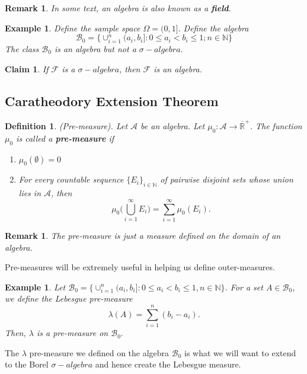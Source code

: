 \documentclass[twoside]{article}
\newtheorem{claim}[theorem]{Claim}
\newtheorem{definition}[theorem]{Definition}
\newtheorem{remark}[theorem]{Remark}
\newtheorem{example}[theorem]{Example}
\newcommand{\algebra}{\mathcal{A}}
\newcommand{\sigmalgebra}{\mathcal{F}}
\newcommand{\borelsigmaalgebra}{\mathcal{B}}
\newcommand{\sa}{\sigma-algebra}
\newcommand{\positiveextendedreal}{\overline{\mathbb{R}}^+}
\begin{document}
\begin{remark}In some text, an algebra is also known as a \textbf{field}.
\end{remark}

\begin{example} Define the sample space $\Omega = (0,1].$ Define the algebra 
$$
\borelsigmaalgebra_0 = \{\cup_{i=1}^{n}(a_i,b_i]: 0 \leq a_i < b_i \leq 1; n \in \mathbb{N}\}
$$
The class $\borelsigmaalgebra_0$ is an algebra but not a $\sa.$
\end{example}



\begin{claim}If $\sigmalgebra$ is a $\sa$, then $\sigmalgebra$ is an algebra.
\end{claim}


\subsection{Caratheodory Extension Theorem}
\begin{definition}(Pre-measure). Let $\algebra$ be an algebra. Let $\mu_0: \algebra \rightarrow \positiveextendedreal$. The function $\mu_0$ is called a \textbf{pre-measure} if 
\begin{enumerate}
\item $\mu_0(\emptyset) = 0$
\item For every countable sequence $\{E_i\}_{i \in \mathbb{N}}$ of pairwise disjoint sets whose union lies in $\algebra$, then 
$$
\mu_0\bigg(\bigcup_{i=1}^{\infty}E_i \bigg) = \sum_{i=1}^{\infty}\mu_0(E_i).
$$
\end{enumerate}
\end{definition}

\begin{remark}The pre-measure is just a measure defined on the domain of an algebra.
\end{remark}

Pre-measures will be extremely useful in helping us define outer-measures.


\begin{example}Let $\borelsigmaalgebra_0 = \{\cup_{i=1}^{n} (a_i, b_i]: 0 \leq a_i < b_i \leq 1, n \in \mathbb{N}\}$. For a set $A \in \borelsigmaalgebra_0$, we define the Lebesgue pre-measure 
$$
\lambda(A) = \sum_{i=1}^{n}(b_i - a_i).
$$
Then, $\lambda$ is a pre-measure on $\borelsigmaalgebra_0.$
\end{example}

The $\lambda$ pre-measure we defined on the algebra $\borelsigmaalgebra_0$ is what we will want to extend to the Borel $\sa$ and hence create the Lebesgue measure.
\end{document}
